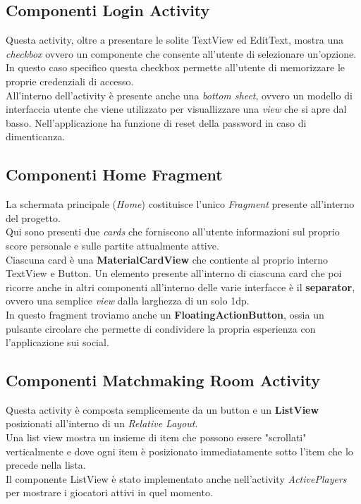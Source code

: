 \documentclass[a4paper,12pt,twoside,openright]{report}
\begin{document}
\subsection{Componenti Login Activity}
Questa activity, oltre a presentare le solite TextView ed EditText, mostra una \textit{checkbox} ovvero un componente che consente all'utente di selezionare un'opzione. In questo caso specifico  questa checkbox permette all'utente di memorizzare le proprie credenziali di accesso.\\
All'interno dell'activity è presente anche una \textit{bottom sheet}, ovvero un modello di interfaccia utente che viene utilizzato per visuallizzare una \textit{view} che si apre dal basso. Nell'applicazione ha funzione di reset della password in caso di dimenticanza.

\subsection{Componenti Home Fragment}
La schermata principale (\textit{Home}) costituisce l'unico \textit{Fragment} presente all'interno del progetto.\\
Qui sono presenti due \textit{cards} che forniscono all'utente informazioni sul proprio score personale e sulle partite attualmente attive.\\
Ciascuna card è una \textbf{MaterialCardView} che contiente al proprio interno TextView e Button. Un elemento presente all'interno di ciascuna card che poi ricorre anche in altri componenti all'interno delle varie interfacce è il \textbf{separator}, ovvero una semplice \textit{view} dalla larghezza di un solo 1dp.\\
In questo fragment troviamo anche un \textbf{FloatingActionButton}, ossia un pulsante circolare che permette di condividere la propria esperienza con l'applicazione sui social.

\subsection{Componenti Matchmaking Room Activity}
Questa activity è composta semplicemente da un button e un \textbf{ListView} posizionati all'interno di un \textit{Relative Layout}.\\
Una list view mostra un insieme di item che possono essere "scrollati" verticalmente e dove ogni item è posizionato immediatamente sotto l'item che lo precede nella lista.\\
Il componente ListView è stato implementato anche nell'activity \textit{ActivePlayers} per mostrare i giocatori attivi in quel momento.
\end{document}
